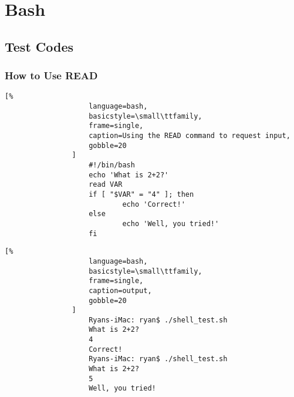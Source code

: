 \documentclass[crop=false,class=article,oneside]{standalone}
\begin{document}
    \ifx\ifcoursesprogrammingtutorials\undefined
        \section*{Bash}
        \setcounter{section}{1}
    \fi
    \subsection{Test Codes}
        \subsubsection{How to Use READ}
            \begin{minipage}[t]{.48\textwidth}
                \centering
                \begin{lstlisting}[%
                    language=bash,
                    basicstyle=\small\ttfamily,
                    frame=single,
                    caption=Using the READ command to request input,
                    gobble=20
                ]
                    #!/bin/bash
                    echo 'What is 2+2?'
                    read VAR
                    if [ "$VAR" = "4" ]; then
                            echo 'Correct!'
                    else
                            echo 'Well, you tried!'
                    fi
                \end{lstlisting}
            \end{minipage}
            \hfill
            \begin{minipage}[t]{.48\textwidth}
                \centering
                \begin{lstlisting}[%
                    language=bash,
                    basicstyle=\small\ttfamily,
                    frame=single,
                    caption=output,
                    gobble=20
                ]
                    Ryans-iMac: ryan$ ./shell_test.sh 
                    What is 2+2?
                    4
                    Correct!
                    Ryans-iMac: ryan$ ./shell_test.sh 
                    What is 2+2?
                    5
                    Well, you tried!
                \end{lstlisting}
            \end{minipage}
        \newpage
\end{document}
